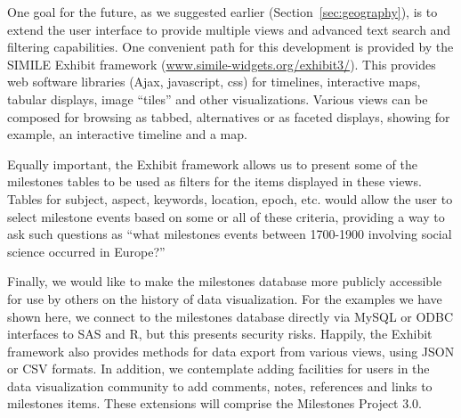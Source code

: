 \documentclass[11pt]{article}
\newcommand*{\secref}[1]{Section~\ref{#1}}
\begin{document}
One goal for the future, as we suggested earlier (\secref{sec:geography}), is to extend the user interface to provide multiple
views and advanced text search and filtering capabilities.
One convenient path for this development is provided by the SIMILE Exhibit framework
(\url{www.simile-widgets.org/exhibit3/}).
This provides web software libraries (Ajax, javascript, css) for
timelines, interactive maps, tabular displays, image ``tiles'' and other visualizations.
Various views can be composed for browsing as tabbed, alternatives or as faceted displays, showing for example, an interactive timeline and
a map.

Equally important, the Exhibit framework allows us to present some of the milestones tables to be used as filters for the items
displayed in these views.
Tables for subject, aspect, keywords, location, epoch, etc. would allow the user to 
select milestone events based on some or all of these criteria, providing a way to ask such questions as
``what milestones events between 1700-1900 involving social science occurred in Europe?'' 

Finally, we would like to make the milestones database more publicly accessible for use by others on the history of data
visualization.
For the examples we have shown here, we connect to the milestones database directly via MySQL or ODBC
interfaces to SAS and R, but this presents security risks.
Happily, the Exhibit framework also provides methods for
data export from various views, using JSON or CSV formats.
In addition, we contemplate adding facilities for users in
the data visualization community to add comments, notes, references and links to milestones items.
These extensions will comprise the Milestones Project 3.0.

%
        
\end{document}
